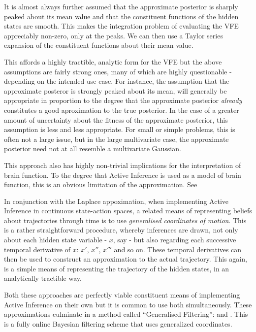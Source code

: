 \documentclass[onecolumn]{IEEEtran}
\begin{document}
It is almost always further assumed that the approximate posterior is sharply peaked about its mean value and that the constituent functions of the hidden states are smooth. This makes the integration problem of evaluating the VFE appreciably non-zero, only at the peaks. We can then use a Taylor series expansion of the constituent functions about their mean value. 

This affords a highly tractible, analytic form for the VFE but the above assumptions are fairly strong ones, many of which are highly questionable - depending on the intended use case. For instance, the assumption that the approximate posteror is strongly peaked about its mean, will generally be appropriate in proportion to the degree that the approximate posterior \textit{already} constitutes a good aproximation to the true posterior. In the case of a greater amount of uncertainty about the fitness of the approximate posterior, this assumption is less and less appropriate. For small or simple problems, this is often not a large issue, but in the large multivariate case, the approximate posterior need not at all resemble a multivariate Gaussian.  

This approach also has highly non-trivial implications for the interpretation of brain function. To the degree that Active Inference is used as a model of brain function, this is an obvious limitation of the approximation. See \textcite{FEP-Mathematical-Review} 

In conjunction with the Laplace appoximation, when implementing Active Inference in continuous state-action spaces, a related means of representing beliefs about trajectories through time is to use \textit{generalised coordinates of motion}. This is a rather straightforward procedure, whereby inferences are drawn, not only about each hidden state variable - $x$, say - but also regarding each successive temporal derivative of $x$: $x'$, $x''$, $x'''$ and so on. These temporal derivatives can then be used to construct an approximation to the actual trajectory. This again, is a simple means of representing the trajectory of the hidden states, in an analytically tractible way. 

Both these approaches are perfectly viable constituent means of implementing Active Inference on their own but it is common to use both simultaneously. These approximations culminate in a method called ``Generalised Filtering'': \textcite{Generalized-Filtering} and \textcite{Bayes-State-Estimation}. This is a fully online Bayesian filtering scheme that uses generalized coordinates.
\end{document}
